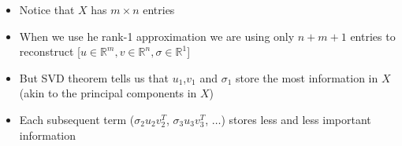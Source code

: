 \begin{frame}
\begin{columns}
\begin{overlayarea}{\textwidth}{\textheight}
\begin{itemize}
				\item<2-> Notice that $X$ has $m\times n$ entries
				\item<3-> When we use he rank-1 approximation we are using only $ n + m + 1$ entries to reconstruct [$u \in \mathbb{R}^{m}, v\in\mathbb{R}^n, \sigma\in \mathbb{R}^1$]
				\item<4-> But SVD theorem tells us that $u_1$,$v_1$ and $\sigma_1$ store the most information in $X$ (akin to the principal components in $X$)
				\item<5-> Each subsequent term ($ \sigma_2 u_2 v_2^T$, $\sigma_3 u_3 v_3^T$, $\dots$) stores less and less important information 
			\end{itemize}
		\end{overlayarea}
	\end{columns}
\end{frame}


